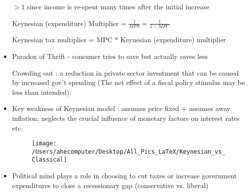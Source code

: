 \documentclass{article}
\begin{document}
\begin{itemize}
$>1$ since income is re-spent many times after the initial increase

Keynesian (expenditure) Multiplier = $\frac{1}{MPS} = \frac{1}{1 - MPC}$

Keynesian tax multiplier = MPC * Keynesian (expenditure) multiplier


\item Paradox of Thrift - consumer tries to save but actually saves less

Crowding out : a reduction in private sector investment that can be caused by increased gov't spending (The net effect of a fiscal policy stimulus may be less than intended).


\item Key weakness of Keynesian model : assumes price fixed + assumes away inflation; neglects the crucial influence of monetary factors on interest rates etc.


\begin{figure}[h!]
  \texttt{[image: /Users/ahecomputer/Desktop/All\_Pics\_LaTeX/Keynesian\_vs\_Classical]}
\end{figure}

\item Political mind plays a role in choosing to cut taxes or increase government expenditures to close a recessionary gap (conservative vs. liberal)
\end{itemize}
\end{document}
